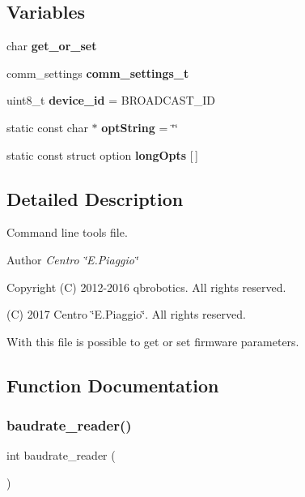 \subsection*{Variables}
\begin{DoxyCompactItemize}
\item 
\mbox{\label{qbparam_8c_a3c28322a1b5922f8c61d7cb3723b56b1}} 
char {\bfseries get\+\_\+or\+\_\+set}
\item 
\mbox{\label{qbparam_8c_a92153f4b70cd8ba4e9b502ccff8d28bf}} 
comm\+\_\+settings {\bfseries comm\+\_\+settings\+\_\+t}
\item 
\mbox{\label{qbparam_8c_aebf6cf4331fcc15f0d3ed0890e01a380}} 
uint8\+\_\+t {\bfseries device\+\_\+id} = B\+R\+O\+A\+D\+C\+A\+S\+T\+\_\+\+ID
\item 
\mbox{\label{qbparam_8c_a1b7271ddd60c22960c39ae6caf4d5254}} 
static const char $\ast$ {\bfseries opt\+String} = \char`\"{}\char`\"{}
\item 
static const struct option {\bfseries long\+Opts} [$\,$]
\end{DoxyCompactItemize}


\subsection{Detailed Description}
Command line tools file. 

\begin{DoxyAuthor}{Author}
{\itshape Centro \char`\"{}\+E.\+Piaggio\char`\"{}} 
\end{DoxyAuthor}
\begin{DoxyCopyright}{Copyright}
(C) 2012-\/2016 qbrobotics. All rights reserved. 

(C) 2017 Centro \char`\"{}\+E.\+Piaggio\char`\"{}. All rights reserved.
\end{DoxyCopyright}
With this file is possible to get or set firmware parameters. 

\subsection{Function Documentation}
\mbox{\label{qbparam_8c_a872d84bb02f7d8f4617246f0c6d37c43}} 
\subsubsection{baudrate\+\_\+reader()}
{\footnotesize\ttfamily int baudrate\+\_\+reader (\begin{DoxyParamCaption}{ }\end{DoxyParamCaption})}

